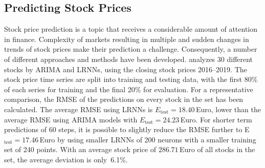 \documentclass[twoside,11pt]{article}
\theoremstyle{definition}
\newcommand{\euro}{Euro}
\begin{document}
\subsection{Predicting Stock Prices}\label{stock}

Stock price prediction is a topic that receives a considerable amount of
attention in finance. Complexity of markets resulting in multiple and sudden
changes in trends of stock prices make their prediction a challenge.
Consequently, a number of different approaches and methods have been developed.
\citet{Lit20} analyzes $30$ different stocks by ARIMA and LRNNs, using the
closing stock prices 2016--2019. The stock price time series are split into
training and testing data, with the first 80\% of each series for training and the
final 20\% for evaluation. For a representative comparison, the RMSE of the
predictions on every stock in the set has been calculated. The average RMSE
using LRNNs is $E_\mathrm{test}=18.40${\,\euro}, lower than the average RMSE
using ARIMA models with $E_\mathrm{test}=24.23${\,\euro}. For shorter term
predictions of 60 steps, it is possible to slightly reduce the RMSE further to
E$_\mathrm{test}=17.46${\,\euro} by using smaller LRNNs of 200 neurons with a
smaller training set of 240 points. With an average stock price of
$286.71${\,\euro} of all stocks in the set, the average deviation is only~6.1\%.
\end{document}
